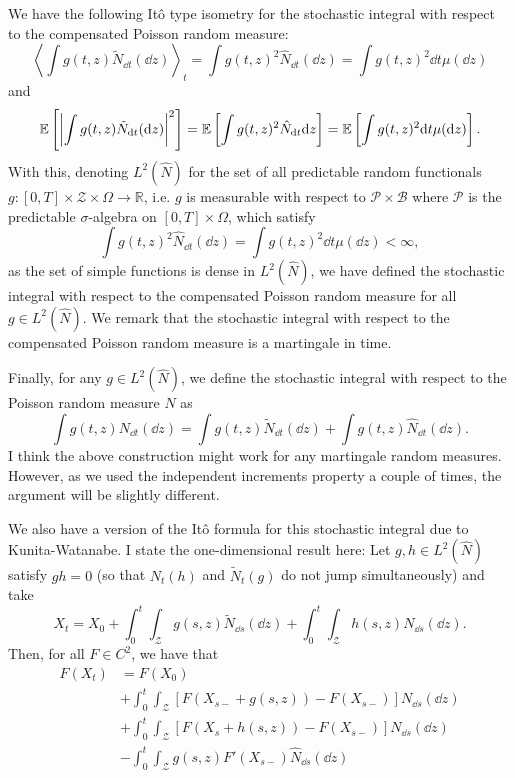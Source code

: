 \documentclass[]{article}
\theoremstyle{definition}
\theoremstyle{definition}
\begin{document}
We have the following It\^o type isometry for the stochastic integral with respect to the compensated 
Poisson random measure:
\[\left\langle \int g(t, z) \tilde N_{\dd t}(\dd z) \right\rangle_t 
  = \int g(t, z)^2 \hat N_{\dd t}(\dd z) = \int g(t, z)^2 \dd t \mu(\dd z)\]
and 
\[\mathbb{E}\left[\abs{\int g(t, z) \tilde N_{\dd t}(\dd z)}^2\right] 
  = \mathbb{E}\left[\int g(t, z)^2 \hat N_{\dd t}{\dd z}\right]
  = \mathbb{E}\left[\int g(t, z)^2 \dd t \mu(\dd z)\right].\]
With this, denoting \(L^2(\hat N)\) for the set of all predictable random functionals 
\(g : [0, T] \times \mathcal{Z} \times \Omega \to \mathbb{R}\), i.e. \(g\) is measurable with respect to
\(\mathcal{P} \times \mathcal{B}\) where \(\mathcal{P}\) is the predictable \(\sigma\)-algebra on \([0, T] \times \Omega\),
which satisfy 
\[\int g(t, z)^2 \hat N_{\dd t}(\dd z) = \int g(t, z)^2 \dd t \mu(\dd z) < \infty,\]
as the set of simple functions is dense in \(L^2(\hat N)\), we have defined the stochastic integral 
with respect to the compensated Poisson random measure for all \(g \in L^2(\hat N)\). We remark that 
the stochastic integral with respect to the compensated Poisson random measure is a martingale in time.

Finally, for any \(g \in L^2(\hat N)\), we define the stochastic integral with respect to the Poisson 
random measure \(N\) as 
\[\int g(t, z) N_{\dd t}(\dd z) = \int g(t, z) \tilde N_{\dd t}(\dd z) + \int g(t, z) \hat N_{\dd t}(\dd z).\]
I think the above construction might work for any martingale random measures. However, as we used the 
independent increments property a couple of times, the argument will be slightly different.

We also have a version of the It\^o formula for this stochastic integral due to Kunita-Watanabe. I state 
the one-dimensional result here:
Let \(g, h \in L^2(\hat N)\) satisfy \(gh = 0\) (so that \(N_t(h)\) and \(\tilde N_t(g)\) do not jump 
simultaneously) and take
\[X_t = X_0 + \int_0^t \int_\mathcal{Z} g(s, z) \tilde N_{\dd s}(\dd z) + 
    \int_0^t \int_\mathcal{Z} h(s, z) N_{\dd s}(\dd z).\]
Then, for all \(F \in C^2\), we have that  
\begin{align*}
  F(X_t) & = F(X_0)\\ 
  & + \int_0^t \int_\mathcal{Z} \left[F(X_{s-} + g(s, z)) - F(X_{s-})\right] N_{\dd s}(\dd z)\\
  & + \int_0^t \int_\mathcal{Z} \left[F(X_{s} + h(s, z)) - F(X_{s-})\right] N_{\dd s}(\dd z)\\
  & - \int_0^t \int_\mathcal{Z} g(s, z) F'(X_{s-}) \hat N_{\dd s}(\dd z)
\end{align*}
\end{document}
